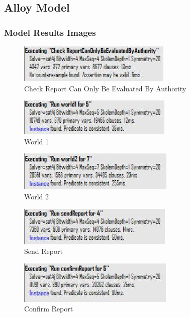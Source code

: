 \documentclass{article}
\begin{document}
\subsection{Alloy Model}


\clearpage

\subsubsection{Model Results Images}
\begin{figure}[H]
    \centering
    \includegraphics[scale=0.9]{img/alloy/check1.png}
    \caption{Check Report Can Only Be Evaluated By Authority} 
\end{figure}

\begin{figure}[H]
    \centering
    \includegraphics[scale=0.9]{img/alloy/world1.png}
    \caption{World 1}
\end{figure}

\begin{figure}[H]
    \centering
    \includegraphics[scale=0.9]{img/alloy/world2.png}
    \caption{World 2}
\end{figure}

\begin{figure}[H]
    \centering
    \includegraphics[scale=0.9]{img/alloy/sendReport.png}
    \caption{Send Report}
\end{figure}

\begin{figure}[H]
    \centering
    \includegraphics[scale=0.9]{img/alloy/confirmReport.png}
    \caption{Confirm Report}
\end{figure}
\end{document}
